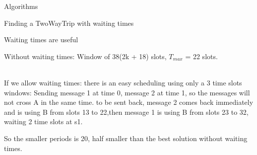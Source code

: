 \documentclass[a4paper,10pt]{report}
\begin{document}
\begin{chapter}{Algorithms}
\begin{section}{Finding a TwoWayTrip with waiting times}
\begin{subsection}{Waiting times are useful}
{{{
  } 
  Without waiting times: Window of 38(2k + 18) slots, $T_{max}$ = 22 slots.
  }}\\
 


If we allow waiting times: there is an easy scheduling using only a 3 time slots windows: 
Sending message 1 at time 0, message 2 at time 1, so the messages will not cross A in the same time. to be sent back,
message 2 comes back immediately and is using B from slots 13 to 22,then message 1 is using B from slots 23 to 32, waiting 2 time slots at s1.

So the smaller periods is 20, half smaller than the best solution without waiting times.\\

\end{subsection}
\end{section}
\end{chapter}
\end{document}
